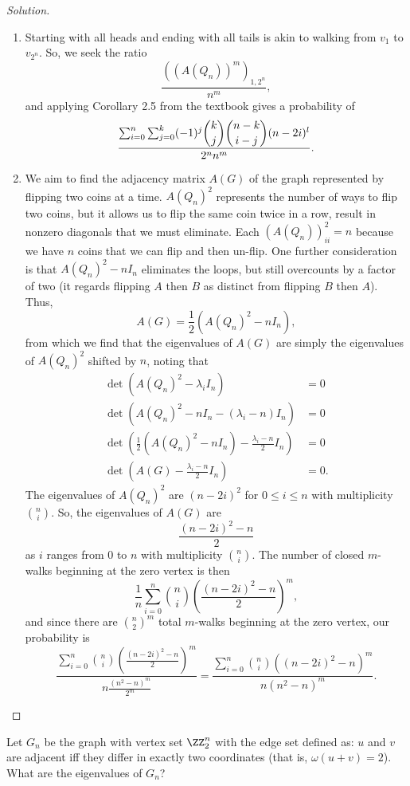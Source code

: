 \documentclass[11pt]{scrartcl}
\begin{document}
\begin{proof}[Solution]
\begin{enumerate}[(i.)]
    \item Starting with all heads and ending with all tails is akin to walking from $v_1$ to $v_{2^n}$. So, we seek the ratio \[\frac{((A(Q_n))^m)_{1,2^n}}{n^m},\] and applying Corollary 2.5 from the textbook gives a probability of \[\frac{\sum_{i=0}^n\sum_{j=0}^k(-1)^j\dbinom{k}{j}\dbinom{n-k}{i-j}(n-2i)^l}{2^nn^m}.\]
    \item We aim to find the adjacency matrix $A(G)$ of the graph represented by flipping two coins at a time. $A(Q_n)^2$ represents the number of ways to flip two coins, but it allows us to flip the same coin twice in a row, result in nonzero diagonals that we must eliminate. Each $(A(Q_n))^2_{ii}=n$ because we have $n$ coins that we can flip and then un-flip. One further consideration is that $A(Q_n)^2-nI_n$ eliminates the loops, but still overcounts by a factor of two (it regards flipping $A$ then $B$ as distinct from flipping $B$ then $A$). Thus, \[A(G)=\frac12(A(Q_n)^2-nI_n),\] from which we find that the eigenvalues of $A(G)$ are simply the eigenvalues of $A(Q_n)^2$ shifted by $n$, noting that
    \begin{align*}
        \det(A(Q_n)^2-\lambda_iI_n)&=0\\
        \det(A(Q_n)^2-nI_n-(\lambda_i-n)I_n)&=0\\
        \det\left(\frac12(A(Q_n)^2-nI_n)-\frac{\lambda_i-n}{2}I_n\right)&=0\\
        \det\left(A(G)-\frac{\lambda_i-n}{2}I_n\right)&=0.
    \end{align*}
    The eigenvalues of $A(Q_n)^2$ are $(n-2i)^2$ for $0\leq i\leq n$ with multiplicity $\binom n i$. So, the eigenvalues of $A(G)$ are \[\frac{(n-2i)^2-n}{2}\] as $i$ ranges from $0$ to $n$ with multiplicity $\binom n i$. The number of closed $m$-walks beginning at the zero vertex is then \[\frac{1}{n}\sum_{i=0}^n\binom n i\left(\frac{(n-2i)^2-n}{2}\right)^m,\] and since there are $\binom{n}{2}^m$ total $m$-walks beginning at the zero vertex, our probability is \[\frac{\sum_{i=0}^n\binom n i\left(\frac{(n-2i)^2-n}{2}\right)^m}{n\frac{(n^2-n)^m}{2^m}}=\frac{\sum_{i=0}^n\binom n i ((n-2i)^2-n)^m}{n(n^2-n)^m}.\]
\end{enumerate}
\end{proof}
\begin{problem}
    Let $G_n$ be the graph with vertex set $\ZZ_2^n$ with the edge set defined as: $u$ and $v$ are adjacent iff they differ in exactly two coordinates (that is, $\omega(u+v)=2$). What are the eigenvalues of $G_n$?
    
\end{problem}
\end{document}

